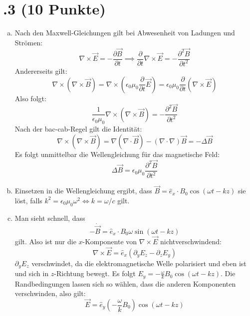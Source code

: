 \section*{\nr.3 \titthree (10 Punkte)}
\begin{enumerate}[(a)]
\item Nach den Maxwell-Gleichungen gilt bei Abwesenheit von Ladungen und Strömen:
\begin{equation}
\nabla \times \vec{E} = -\frac{\partial\vec{B}}{\partial t} \implies \frac{\partial}{\partial t} \nabla \times \vec{E} = -\frac{\partial^2\vec{B}}{\partial t^2} 
\end{equation}
Andererseits gilt:
\begin{equation}
\nabla \times \left(\nabla \times \vec{B}\right) = \nabla \times \left(\epsilon_0 \mu_0 \frac{\partial}{\partial t} \vec{E} \right) = \epsilon_0 \mu_0 \frac{\partial}{\partial t}\left(\nabla \times  \vec{E} \right)
\end{equation}
Also folgt:
\begin{equation}
\frac{1}{\epsilon_0\mu_0}\nabla \times \left(\nabla \times \vec{B}\right) = -\frac{\partial^2\vec{B}}{\partial t^2}
\end{equation}
Nach der bac-cab-Regel gilt die Identität:
\begin{equation}
\nabla \times \left(\nabla \times \vec{B}\right) = \nabla(\nabla \cdot \vec{B})- (\nabla \cdot \nabla) \vec{B}= -\Delta \vec{B}
\end{equation}
Es folgt unmittelbar die Wellengleichung für das magnetische Feld:
\begin{equation}
\Delta \vec{B}= \epsilon_0 \mu_0 \frac{\partial^2\vec{B}}{\partial t^2} 
\end{equation}
\item Einsetzen in die Wellengleichung ergibt, dass $\vec{B} = \hat{e}_x \cdot B_0 \cos{(\omega t - kz)}$ sie löst, falls $k^2 = \epsilon_0 \mu_0 \omega^2 \iff k=\omega/c$ gilt.

\item Man sieht schnell, dass
\begin{equation}
-\dot{\vec{B}} = \hat{e}_x \cdot B_0 \omega \sin{(\omega t - kz)}
\end{equation}
gilt. Also ist nur die $x$-Komponente von $\nabla \times \vec{E}$ nichtverschwindend: 
\begin{equation}
\nabla \times \vec{E} = \hat{e}_x (\partial_y E_z -\partial_z E_y)
\end{equation}
$\partial_y E_z$ verschwindet, da die elektromagnetische Welle polarisiert und eben ist und sich in $z$-Richtung bewegt. Es folgt $E_y= -\frac{\omega}{k}B_0\cos (\omega t - kz)$. Die Randbedingungen lassen sich so wählen, dass die anderen Komponenten verschwinden, also gilt:
\begin{equation}
\vec{E} = \hat{e}_y \left( -\frac{\omega}{k}B_0 \right) \cos (\omega t - kz)
\end{equation}


\end{enumerate}
